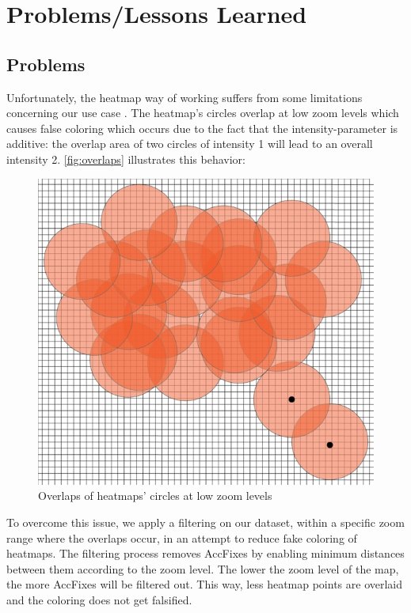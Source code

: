 \documentclass[10pt,a4paper]{article} %
\begin{document}
    

    
    

    \section{Problems/Lessons Learned}
	\subsection{Problems}

	Unfortunately, the heatmap way of working suffers from some limitations concerning our use case \cite{limitation}. The heatmap's circles overlap at low zoom levels which causes false coloring which occurs due to the fact that the intensity-parameter is additive: the overlap area of two circles of intensity 1 will lead to an overall intensity 2. \autoref{fig:overlaps} illustrates this behavior:
    
    \begin{figure}[H]
    \centering
	   
       \includegraphics[scale =0.4]{pic6}
    \caption{Overlaps of heatmaps' circles at low zoom levels}
		  \label{fig:overlaps}
       
    \end{figure}
    \noindent
    To overcome this issue, we apply a filtering on our dataset, within a specific zoom range where the overlaps occur, in an attempt to reduce fake coloring of heatmaps.
	The filtering process removes AccFixes by enabling minimum distances between them according to the zoom level.
	The lower the zoom level of the map, the more AccFixes will be filtered out.
	This way, less heatmap points are overlaid and the coloring does not get falsified.
\end{document}

